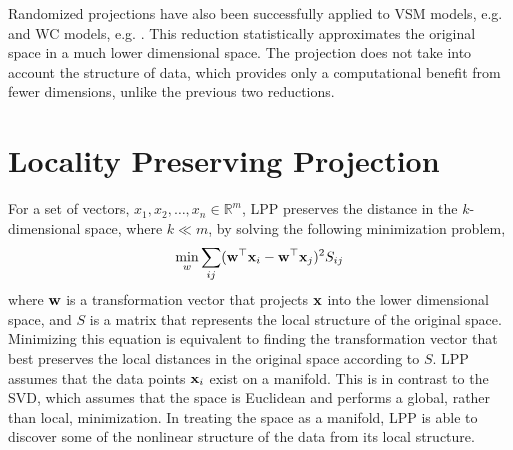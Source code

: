 \documentclass[11pt]{article}
\begin{document}
Randomized projections have also been successfully applied to VSM models, e.g.
\cite{kanerva00random} and WC models, e.g. \cite{sahlgren08permutations}.  This
reduction statistically approximates the original space in a much lower
dimensional space. The projection does not take into account the structure
of data, which provides only a computational benefit from fewer dimensions,
unlike the previous two reductions.

\section{Locality Preserving Projection}
\label{sec:lpp}
For a set of vectors, $x_1, x_2, \ldots, x_n \in \mathbb{R}^m$, LPP preserves the
distance in the $k$-dimensional space, where $k \ll m$, by solving the following
minimization problem,
\begin{equation}
  \min_w \sum_{ij}({\bf w}^{\top}{\bf x}_i - {\bf w}^{\top}{\bf x}_j)^{2}S_{ij}
\end{equation}
where ${\bf w}$ is a transformation vector that projects ${\bf x}$ into the lower
dimensional space, and $S$ is a matrix that represents the local structure of
the original space.  Minimizing this equation is equivalent to finding the
transformation vector that best preserves the local distances in the original
space according to $S$.  LPP assumes that the data points ${\bf x}_i$ exist on a
manifold.  This is in contrast to the SVD, which assumes that the space is
Euclidean and performs a global, rather than local, minimization.  In treating
the space as a manifold, LPP is able to discover some of the nonlinear structure
of the data from its local structure.
\end{document}
